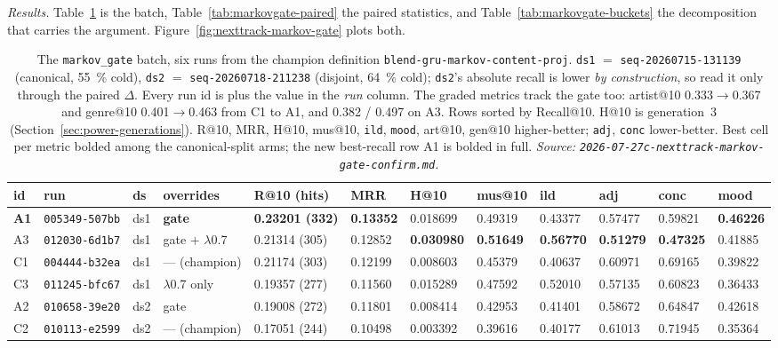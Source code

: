 \documentclass[11pt]{article}
\newcommand{\runid}[1]{\texttt{\small\seqsplit{#1}}}
\newcommand{\dsid}[1]{\texttt{\small #1}}
\newcommand{\best}[1]{\textbf{#1}}
\begin{document}
\emph{Results.} Table~\ref{tab:markovgate} is the batch,
Table~\ref{tab:markovgate-paired} the paired statistics, and
Table~\ref{tab:markovgate-buckets} the decomposition that carries the argument.
Figure~\ref{fig:nexttrack-markov-gate} plots both.

\begin{table}[ht]
  \centering
  \caption{The \texttt{markov\_gate} batch, six runs from the champion definition
  \texttt{blend-gru-markov-content-proj}. \dsid{ds1} $=$
  \dsid{seq-20260715-131139} (canonical, \SI{55}{\percent} cold), \dsid{ds2} $=$
  \dsid{seq-20260718-211238} (disjoint, \SI{64}{\percent} cold);
  \dsid{ds2}'s absolute recall is lower \emph{by construction}, so read it only
  through the paired $\Delta$. Every run id is \protect\runid{run-20260728-} plus
  the value in the \emph{run} column. The graded metrics track the gate too:
  artist@10 \num{0.333}$\to$\num{0.367} and genre@10 \num{0.401}$\to$\num{0.463}
  from C1 to A1, and \num{0.382} / \num{0.497} on A3.
  Rows sorted by Recall@10. H@10 is generation~3
  (Section~\ref{sec:power-generations}). R@10, MRR, H@10, mus@10, \texttt{ild},
  \texttt{mood}, art@10, gen@10 higher-better; \texttt{adj}, \texttt{conc}
  lower-better. Best cell per metric bolded among the canonical-split arms; the
  new best-recall row A1 is bolded in full.
  \emph{Source: \texttt{2026-07-27c-nexttrack-markov-gate-confirm.md}.}}
  \label{tab:markovgate}
  {\scriptsize\setlength{\tabcolsep}{1.9pt}\begin{tabular}{llllllllllll}
    \toprule
    id & run & ds & overrides & R@10 (hits) & MRR & H@10 & mus@10 & ild & adj & conc & mood \\
    \midrule
    \best{A1} & \texttt{005349-507bb} & ds1 & \best{gate} & \best{0.23201 (332)} & \best{0.13352} & 0.018699 & 0.49319 & 0.43377 & 0.57477 & 0.59821 & \best{0.46226} \\
    A3 & \texttt{012030-6d1b7} & ds1 & gate $+$ $\lambda$0.7 & 0.21314 (305) & 0.12852 & \best{0.030980} & \best{0.51649} & \best{0.56770} & \best{0.51279} & \best{0.47325} & 0.41885 \\
    C1 & \texttt{004444-b32ea} & ds1 & --- (champion) & 0.21174 (303) & 0.12199 & 0.008603 & 0.45379 & 0.40637 & 0.60971 & 0.69165 & 0.39822 \\
    C3 & \texttt{011245-bfc67} & ds1 & $\lambda$0.7 only & 0.19357 (277) & 0.11560 & 0.015289 & 0.47592 & 0.52010 & 0.57135 & 0.60823 & 0.36433 \\
    A2 & \texttt{010658-39e20} & ds2 & gate & 0.19008 (272) & 0.11801 & 0.008414 & 0.42953 & 0.41401 & 0.58672 & 0.64847 & 0.42618 \\
    C2 & \texttt{010113-e2599} & ds2 & --- (champion) & 0.17051 (244) & 0.10498 & 0.003392 & 0.39616 & 0.40177 & 0.61013 & 0.71945 & 0.35364 \\
    \bottomrule
  \end{tabular}}
\end{table}
\end{document}
